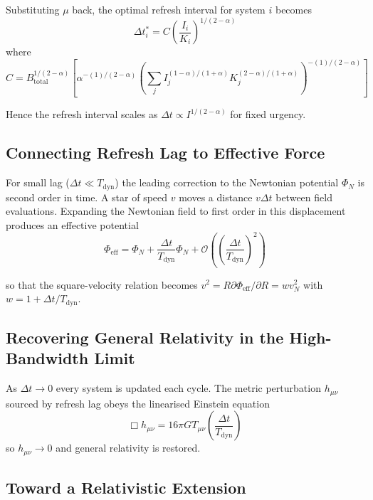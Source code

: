 \documentclass[twocolumn,prd,amsmath,amssymb,aps,superscriptaddress,nofootinbib]{revtex4-2}
\begin{document}
Substituting $\mu$ back, the optimal refresh interval for system $i$ becomes
\begin{equation}
\Delta t_i^* = C \left( \frac{I_i}{K_i} \right)^{1/(2-\alpha)}
\end{equation}
where 
\begin{equation}
C = B_{\text{total}}^{1/(2-\alpha)} \left[ \alpha^{-(1)/(2-\alpha)} \left(\sum_j I_j^{(1-\alpha)/(1+\alpha)} K_j^{(2-\alpha)/(1+\alpha)} \right)^{-(1)/(2-\alpha)} \right]
\end{equation}

Hence the refresh interval scales as $\Delta t \propto I^{1/(2-\alpha)}$ for fixed urgency.

\subsection{Connecting Refresh Lag to Effective Force}

For small lag ($\Delta t \ll T_{\text{dyn}}$) the leading correction to the Newtonian potential $\Phi_N$ is second order in time. A star of speed $v$ moves a distance $v\Delta t$ between field evaluations. Expanding the Newtonian field to first order in this displacement produces an effective potential
\begin{equation}
\Phi_{\text{eff}} = \Phi_N + \frac{\Delta t}{T_{\text{dyn}}} \Phi_N + \mathcal{O}\left(\left(\frac{\Delta t}{T_{\text{dyn}}}\right)^2\right)
\end{equation}

so that the square-velocity relation becomes $v^2 = R \partial\Phi_{\text{eff}}/\partial R = w v_N^2$ with $w = 1 + \Delta t/T_{\text{dyn}}$.

\subsection{Recovering General Relativity in the High-Bandwidth Limit}

As $\Delta t \to 0$ every system is updated each cycle. The metric perturbation $h_{\mu\nu}$ sourced by refresh lag obeys the linearised Einstein equation
\begin{equation}
\Box h_{\mu\nu} = 16\pi G T_{\mu\nu} \left(\frac{\Delta t}{T_{\text{dyn}}}\right)
\end{equation}
so $h_{\mu\nu} \to 0$ and general relativity is restored.

\subsection{Toward a Relativistic Extension}
\end{document}
